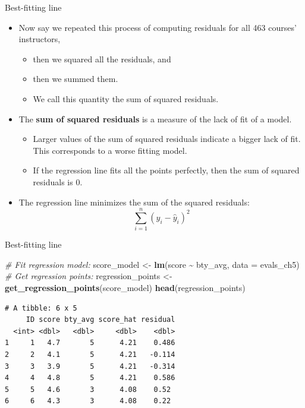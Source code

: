 \documentclass[
  ignorenonframetext,
]{beamer}
\newenvironment{Shaded}{\begin{snugshade}}{\end{snugshade}}
\newcommand{\AttributeTok}[1]{\textcolor[rgb]{0.13,0.29,0.53}{#1}}
\newcommand{\CommentTok}[1]{\textcolor[rgb]{0.56,0.35,0.01}{\textit{#1}}}
\newcommand{\FunctionTok}[1]{\textcolor[rgb]{0.13,0.29,0.53}{\textbf{#1}}}
\newcommand{\NormalTok}[1]{#1}
\newcommand{\OtherTok}[1]{\textcolor[rgb]{0.56,0.35,0.01}{#1}}
\newcommand{\SpecialCharTok}[1]{\textcolor[rgb]{0.81,0.36,0.00}{\textbf{#1}}}
\providecommand{\tightlist}{%
  \setlength{\itemsep}{0pt}\setlength{\parskip}{0pt}}
\begin{document}
\begin{frame}{Best-fitting line}
\protect\hypertarget{best-fitting-line-1}{}
\begin{itemize}
\item
  Now say we repeated this process of computing residuals for all 463
  courses' instructors,

  \begin{itemize}
  \tightlist
  \item
    then we squared all the residuals, and
  \item
    then we summed them.
  \item
    We call this quantity the sum of squared residuals.
  \end{itemize}
\item
  The \textbf{sum of squared residuals} is a measure of the lack of fit
  of a model.

  \begin{itemize}
  \tightlist
  \item
    Larger values of the sum of squared residuals indicate a bigger lack
    of fit. This corresponds to a worse fitting model.
  \item
    If the regression line fits all the points perfectly, then the sum
    of squared residuals is 0.
  \end{itemize}
\item
  The regression line minimizes the sum of the squared residuals:
  \[\sum_{i=1}^n(y_i-\hat{y}_i)^2\]
\end{itemize}
\end{frame}

\begin{frame}[fragile]{Best-fitting line}
\protect\hypertarget{best-fitting-line-2}{}
\normalsize

\begin{Shaded}
\begin{Highlighting}[]
\CommentTok{\# Fit regression model:}
\NormalTok{score\_model }\OtherTok{\textless{}{-}} \FunctionTok{lm}\NormalTok{(score }\SpecialCharTok{\textasciitilde{}}\NormalTok{ bty\_avg, }\AttributeTok{data =}\NormalTok{ evals\_ch5)}
\CommentTok{\# Get regression points:}
\NormalTok{regression\_points }\OtherTok{\textless{}{-}} \FunctionTok{get\_regression\_points}\NormalTok{(score\_model)}
\FunctionTok{head}\NormalTok{(regression\_points)}
\end{Highlighting}
\end{Shaded}

\begin{verbatim}
# A tibble: 6 x 5
     ID score bty_avg score_hat residual
  <int> <dbl>   <dbl>     <dbl>    <dbl>
1     1   4.7       5      4.21    0.486
2     2   4.1       5      4.21   -0.114
3     3   3.9       5      4.21   -0.314
4     4   4.8       5      4.21    0.586
5     5   4.6       3      4.08    0.52 
6     6   4.3       3      4.08    0.22 
\end{verbatim}

\normalsize
\end{frame}
\end{document}
